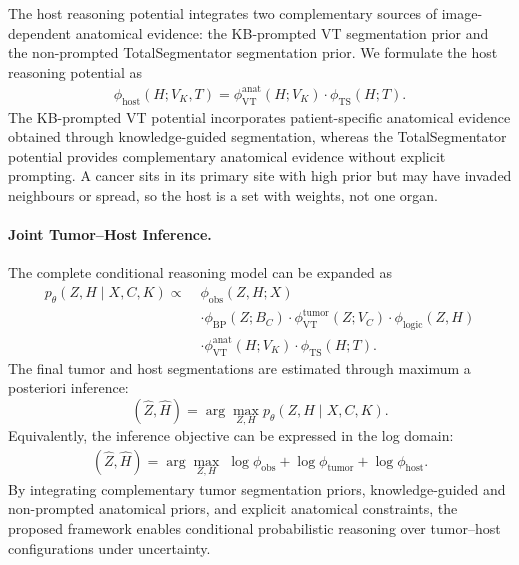 \documentclass[fleqn,10pt]{olplainarticle}
\begin{document}
The host reasoning potential integrates
two complementary sources of image-dependent
anatomical evidence: the KB-prompted VT
segmentation prior and the non-prompted
TotalSegmentator segmentation prior.
We formulate the host reasoning potential as
\begin{equation}
\label{eq:host_reasoning}
\begin{aligned}
\phi_{\mathrm{host}}(H;V_K,T)
={}\phi_{\mathrm{VT}}^{\mathrm{anat}}(H;V_K) \cdot
\phi_{\mathrm{TS}}(H;T).
\end{aligned}
\end{equation}
The KB-prompted VT potential incorporates
patient-specific anatomical evidence
obtained through knowledge-guided
segmentation, whereas the TotalSegmentator
potential provides complementary anatomical
evidence without explicit prompting.
A cancer sits in its primary site with high prior but may have invaded neighbours or spread, so the host is a set with weights, not one organ.

\paragraph{Joint Tumor--Host Inference.}

The complete conditional reasoning model
can be expanded as
\begin{equation}
\label{eq:expanded_reasoning}
\boxed{
\begin{aligned}
p_\theta(Z,H\mid X,C,K)
\propto\;&\phi_{\mathrm{obs}}(Z,H;X) \\
&\cdot\phi_{\mathrm{BP}}(Z;B_C) \cdot\phi_{\mathrm{VT}}^{\mathrm{tumor}}
(Z;V_C) \cdot\phi_{\mathrm{logic}}(Z,H) \\
&\cdot\phi_{\mathrm{VT}}^{\mathrm{anat}}
(H;V_K) \cdot\phi_{\mathrm{TS}}(H;T).
\end{aligned}
}
\end{equation}
The final tumor and host segmentations
are estimated through maximum a posteriori
inference:
\begin{equation}
\label{eq:map_inference}
(\hat Z,\hat H)
=
\arg\max_{Z,H}
p_\theta(Z,H\mid X,C,K).
\end{equation}
Equivalently, the inference objective
can be expressed in the log domain:
\begin{equation}
\label{eq:log_inference}
\begin{aligned}
(\hat Z,\hat H)
=
\arg\max_{Z,H}\;
\log\phi_{\mathrm{obs}} +\log\phi_{\mathrm{tumor}} +\log\phi_{\mathrm{host}}.
\end{aligned}
\end{equation}
By integrating complementary tumor
segmentation priors, knowledge-guided
and non-prompted anatomical priors,
and explicit anatomical constraints,
the proposed framework enables
conditional probabilistic reasoning
over tumor--host configurations
under uncertainty.
\end{document}
